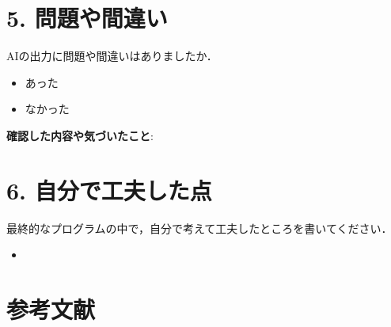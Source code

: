 \documentclass[a4paper,11pt]{jsarticle}
\begin{document}
\section*{5. 問題や間違い}
AIの出力に問題や間違いはありましたか．
\begin{itemize}
    \item[$\boxtimes$] あった
    \item[$\square$] なかった
\end{itemize}
\textbf{確認した内容や気づいたこと}:


\section*{6. 自分で工夫した点}
最終的なプログラムの中で，自分で考えて工夫したところを書いてください．
\begin{itemize}
    \item
\end{itemize}

\section*{参考文献}
\end{document}
